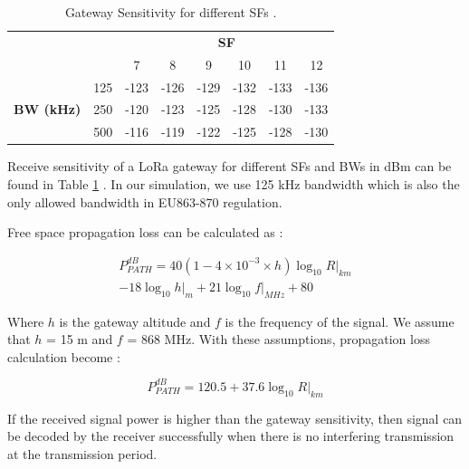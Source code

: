 \documentclass[conference]{IEEEtran}
\begin{document}
\begin{table}
\centering
\caption{Gateway Sensitivity for different SFs \cite{SX1276}.}
\label{table:gw_sf_sensitivity}
\begin{tabular}{|c|c|c|c|c|c|c|c|}
\hline
\multicolumn{2}{|c|}{\multirow{2}{*}{}} & \multicolumn{6}{c|}{\textbf{SF}} \\ \cline{3-8}
\multicolumn{2}{|c|}{}                  &    7 &    8 &    9 &   10 &   11 &   12 \\ \hline
\multirow{3}{*}{\textbf{BW (kHz)}}  & 125 & -123 & -126 & -129 & -132 & -133 & -136 \\ \cline{2-8}
                                    & 250 & -120 & -123 & -125 & -128 & -130 & -133 \\ \cline{2-8}
                                    & 500 & -116 & -119 & -122 & -125 & -128 & -130 \\ \hline
\end{tabular}
\end{table}

\par Receive sensitivity of a LoRa gateway for different SFs and BWs in dBm can be found in Table \ref{table:gw_sf_sensitivity} \cite{SX1276}. In our simulation, we use 125 kHz bandwidth which is also the only allowed bandwidth in EU863-870 regulation.

\par Free space propagation loss can be calculated as \cite{TR136.942}:

\begin{equation} \label{eq:propagation_loss}
\begin{split}
P^{dB}_{PATH} = 40(1 - 4 \times 10^{-3} \times h){\log_{10} R|_{km}} \\
- 18 {\log_{10} h|_{m}} + 21 {\log_{10} f|_{MHz}} + 80
\end{split}
\end{equation}

\par Where $h$ is the gateway altitude and $f$ is the frequency of the signal. We assume that $h$ = 15 m and $f$ = 868 MHz. With these assumptions, propagation loss calculation become \cite{7996384}:

\begin{equation} \label{eq:propagation_loss_simplified}
P^{dB}_{PATH} = 120.5 + 37.6 {\log_{10} R|_{km}}
\end{equation}

\par If the received signal power is higher than the gateway sensitivity, then signal can be decoded by the receiver successfully when there is no interfering transmission at the transmission period.
\end{document}
